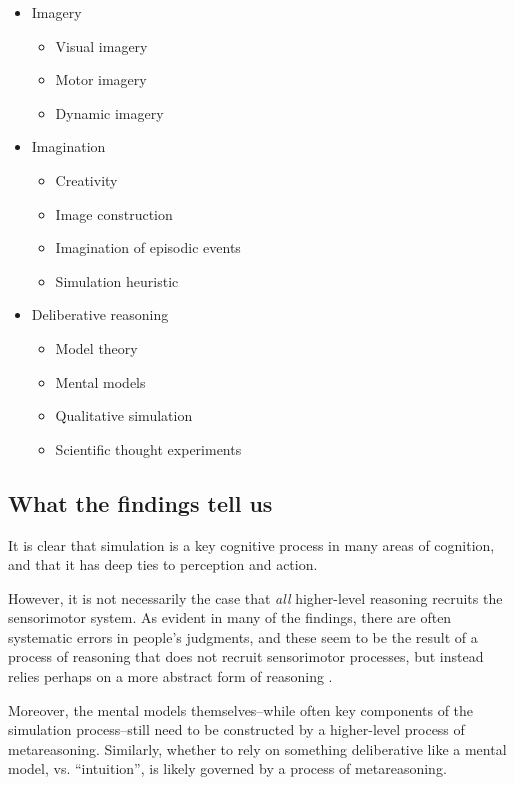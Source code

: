 \documentclass[12pt]{article}
\begin{document}
\begin{itemize}
\item Imagery
    \begin{itemize}
    \item Visual imagery \citep{Kosslyn2006,Kosslyn1988,Shepard1971}
    \item Motor imagery \citep{Parsons1994}
    \item Dynamic imagery \citep{Schwartz1999a,Flusberg2011}
    \end{itemize}
\item Imagination
    \begin{itemize}
    \item Creativity \citep{Finke1988}
    \item Image construction \citep{Kosslyn1988}
    \item Imagination of episodic events \citep{Schacter2012}
    \item Simulation heuristic \citep{Kahneman1981}
    \end{itemize}
\item Deliberative reasoning
    \begin{itemize}
    \item Model theory \citep{Johnson-Laird2012,Khemlani2013}
    \item Mental models \citep{Craik1943,Gentner1983,Hegarty2004}
    \item Qualitative simulation \citep{Kuipers1986,Forbus2011}
    \item Scientific thought experiments \citep{Gendler1998,Trickett2007,Clement2009,Brown2014}
    \end{itemize}
\end{itemize}

\subsection*{What the findings tell us}

It is clear that simulation is a key cognitive process in many areas of cognition, and that it has deep ties to perception and action.

However, it is not necessarily the case that \textit{all} higher-level reasoning recruits the sensorimotor system. As evident in many of the findings, there are often systematic errors  in people's judgments, and these seem to be the result of a process of reasoning that does not recruit sensorimotor processes, but instead relies perhaps on a more abstract form of reasoning .

Moreover, the mental models themselves--while often key components of the simulation process--still need to be constructed by a higher-level process of metareasoning. Similarly, whether to rely on something deliberative like a mental model, vs. ``intuition'', is likely governed by a process of metareasoning.

\end{document}
